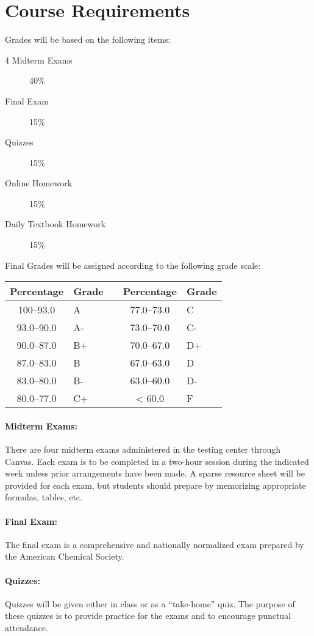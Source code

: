 \documentclass[12pt, letterpaper]{article}
\begin{document}
\section*{Course Requirements}
Grades will be based on the following items:
\begin{description}
  \item[4 Midterm Exams] 40\%
  \item[Final Exam] 15\%
  \item[Quizzes] 15\%
  \item[Online Homework] 15\%
  \item[Daily Textbook Homework] 15\%
\end{description}
Final Grades will be assigned according to the following grade scale:

\begin{tabular}{cl|c|cl}
	Percentage & Grade &  & Percentage & Grade \\ \midrule
	100--93.0 & A     &  &  77.0--73.0 & C     \\
	93.0--90.0 & A-    &  &  73.0--70.0 & C-    \\
	90.0--87.0 & B+    &  &  70.0--67.0 & D+    \\
	87.0--83.0 & B     &  &  67.0--63.0 & D     \\
	83.0--80.0 & B-    &  &  63.0--60.0 & D-    \\
	80.0--77.0 & C+    &  &     < 60.0 & F
\end{tabular}

\paragraph{Midterm Exams:}
There are four midterm exams administered in the testing center through Canvas. Each exam is to be completed in a two-hour session during the indicated week unless prior arrangements have been made. A sparse resource sheet will be provided for each exam, but students should prepare by memorizing appropriate formulas, tables, etc.

\paragraph{Final Exam:}
The final exam is a comprehensive and nationally normalized exam prepared by the American Chemical Society.

\paragraph{Quizzes:}
Quizzes will be given either in class or as a ``take-home'' quiz. The purpose of these quizzes is to provide practice for the exams and to encourage punctual attendance.
\end{document}
